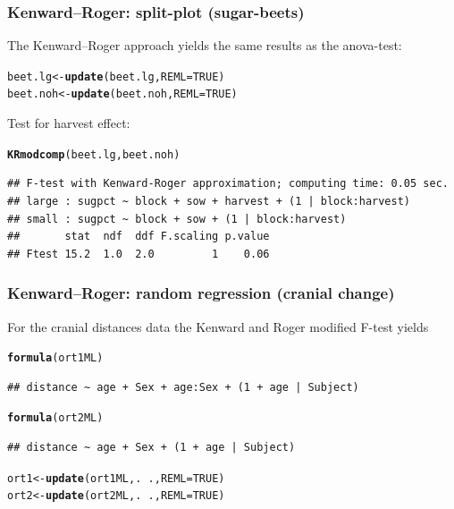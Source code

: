 \documentclass[compress]{beamer}\usepackage[]{graphicx}\usepackage[]{color}
\makeatletter
\newcommand{\hlnum}[1]{\textcolor[rgb]{0.686,0.059,0.569}{#1}}%
\newcommand{\hlopt}[1]{\textcolor[rgb]{0,0,0}{#1}}%
\newcommand{\hlstd}[1]{\textcolor[rgb]{0.345,0.345,0.345}{#1}}%
\newcommand{\hlkwb}[1]{\textcolor[rgb]{0.69,0.353,0.396}{#1}}%
\newcommand{\hlkwc}[1]{\textcolor[rgb]{0.333,0.667,0.333}{#1}}%
\newcommand{\hlkwd}[1]{\textcolor[rgb]{0.737,0.353,0.396}{\textbf{#1}}}%
\newenvironment{kframe}{%
 \def\at@end@of@kframe{}%
 \ifinner\ifhmode%
  \def\at@end@of@kframe{\end{minipage}}%
  \begin{minipage}{\columnwidth}%
 \fi\fi%
 \def\FrameCommand##1{\hskip\@totalleftmargin \hskip-\fboxsep
 \colorbox{shadecolor}{##1}\hskip-\fboxsep
     \hskip-\linewidth \hskip-\@totalleftmargin \hskip\columnwidth}%
 \MakeFramed {\advance\hsize-\width
   \@totalleftmargin\z@ \linewidth\hsize
   \@setminipage}}%
 {\par\unskip\endMakeFramed%
 \at@end@of@kframe}
\newenvironment{knitrout}{}{} %
\newenvironment{sframe}
{\begin{frame} [containsverbatim] }
  {\end{frame}}
\makeatother
\begin{document}
\begin{sframe}
  \frametitle{Kenward--Roger: split-plot (sugar-beets)}
The Kenward--Roger approach yields the same results
as the anova-test:

\begin{knitrout}\scriptsize
{}\color{fgcolor}\begin{kframe}
\begin{alltt}
\hlstd{beet.lg} \hlkwb{<-} \hlkwd{update}\hlstd{(beet.lg,} \hlkwc{REML}\hlstd{=}\hlnum{TRUE}\hlstd{)}
\hlstd{beet.noh} \hlkwb{<-} \hlkwd{update}\hlstd{(beet.noh,} \hlkwc{REML}\hlstd{=}\hlnum{TRUE}\hlstd{)}
\end{alltt}
\end{kframe}
\end{knitrout}
Test for harvest effect:
\begin{knitrout}\scriptsize
{}\color{fgcolor}\begin{kframe}
\begin{alltt}
\hlkwd{KRmodcomp}\hlstd{(beet.lg, beet.noh)}
\end{alltt}
\begin{verbatim}
## F-test with Kenward-Roger approximation; computing time: 0.05 sec.
## large : sugpct ~ block + sow + harvest + (1 | block:harvest)
## small : sugpct ~ block + sow + (1 | block:harvest)
##       stat  ndf  ddf F.scaling p.value
## Ftest 15.2  1.0  2.0         1    0.06
\end{verbatim}
\end{kframe}
\end{knitrout}
\end{sframe}



\begin{sframe}
  \frametitle{Kenward--Roger:  random regression (cranial change)}
For the cranial distances  data the
Kenward and Roger modified F-test yields
\begin{knitrout}\scriptsize
{}\color{fgcolor}\begin{kframe}
\begin{alltt}
\hlkwd{formula}\hlstd{(ort1ML)}
\end{alltt}
\begin{verbatim}
## distance ~ age + Sex + age:Sex + (1 + age | Subject)
\end{verbatim}
\begin{alltt}
\hlkwd{formula}\hlstd{(ort2ML)}
\end{alltt}
\begin{verbatim}
## distance ~ age + Sex + (1 + age | Subject)
\end{verbatim}
\begin{alltt}
\hlstd{ort1}\hlkwb{<-} \hlkwd{update}\hlstd{(ort1ML, .}\hlopt{~}\hlstd{.,} \hlkwc{REML} \hlstd{=} \hlnum{TRUE}\hlstd{)}
\hlstd{ort2}\hlkwb{<-} \hlkwd{update}\hlstd{(ort2ML, .}\hlopt{~}\hlstd{.,} \hlkwc{REML} \hlstd{=} \hlnum{TRUE}\hlstd{)}
\end{alltt}
\end{kframe}
\end{knitrout}
\end{sframe}
\end{document}
